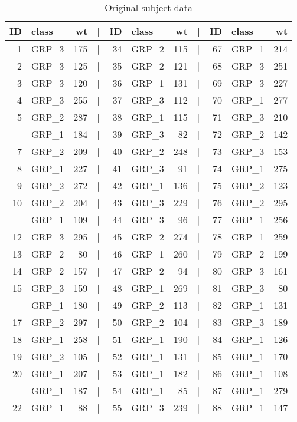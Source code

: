 \documentclass[smallextended]{svjour3}       %
\begin{document}
\begin{table}
\caption{\label{tab:subject-weights}Original subject data}
\centering
\begin{tabular}[t]{rlrlrlrlrlr}
\toprule
ID & class & wt & | & ID & class & wt & | & ID & class & wt\\
\midrule
1 & GRP\_3 & 175 & | & 34 & GRP\_2 & 115 & | & 67 & GRP\_1 & 214\\
2 & GRP\_3 & 125 & | & 35 & GRP\_2 & 121 & | & 68 & GRP\_3 & 251\\
3 & GRP\_3 & 120 & | & 36 & GRP\_1 & 131 & | & 69 & GRP\_3 & 227\\
4 & GRP\_3 & 255 & | & 37 & GRP\_3 & 112 & | & 70 & GRP\_1 & 277\\
5 & GRP\_2 & 287 & | & 38 & GRP\_1 & 115 & | & 71 & GRP\_3 & 210\\
\addlinespace
6 & GRP\_1 & 184 & | & 39 & GRP\_3 & 82 & | & 72 & GRP\_2 & 142\\
7 & GRP\_2 & 209 & | & 40 & GRP\_2 & 248 & | & 73 & GRP\_3 & 153\\
8 & GRP\_1 & 227 & | & 41 & GRP\_3 & 91 & | & 74 & GRP\_1 & 275\\
9 & GRP\_2 & 272 & | & 42 & GRP\_1 & 136 & | & 75 & GRP\_2 & 123\\
10 & GRP\_2 & 204 & | & 43 & GRP\_3 & 229 & | & 76 & GRP\_2 & 295\\
\addlinespace
11 & GRP\_1 & 109 & | & 44 & GRP\_3 & 96 & | & 77 & GRP\_1 & 256\\
12 & GRP\_3 & 295 & | & 45 & GRP\_2 & 274 & | & 78 & GRP\_1 & 259\\
13 & GRP\_2 & 80 & | & 46 & GRP\_1 & 260 & | & 79 & GRP\_2 & 199\\
14 & GRP\_2 & 157 & | & 47 & GRP\_2 & 94 & | & 80 & GRP\_3 & 161\\
15 & GRP\_3 & 159 & | & 48 & GRP\_1 & 269 & | & 81 & GRP\_3 & 80\\
\addlinespace
16 & GRP\_1 & 180 & | & 49 & GRP\_2 & 113 & | & 82 & GRP\_1 & 131\\
17 & GRP\_2 & 297 & | & 50 & GRP\_2 & 104 & | & 83 & GRP\_3 & 189\\
18 & GRP\_1 & 258 & | & 51 & GRP\_1 & 190 & | & 84 & GRP\_1 & 126\\
19 & GRP\_2 & 105 & | & 52 & GRP\_1 & 131 & | & 85 & GRP\_1 & 170\\
20 & GRP\_1 & 207 & | & 53 & GRP\_1 & 182 & | & 86 & GRP\_1 & 108\\
\addlinespace
21 & GRP\_1 & 187 & | & 54 & GRP\_1 & 85 & | & 87 & GRP\_1 & 279\\
22 & GRP\_1 & 88 & | & 55 & GRP\_3 & 239 & | & 88 & GRP\_1 & 147\\

\end{tabular}
\end{table}
\end{document}
